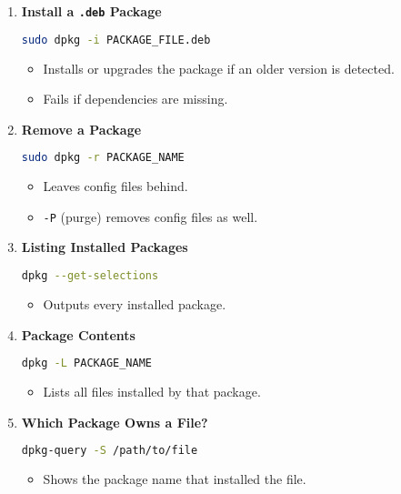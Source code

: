 \documentclass[a4paper]{report}
\begin{document}
\begin{enumerate}
    \item \textbf{Install a \texttt{.deb} Package}
    \begin{lstlisting}[language=bash]
sudo dpkg -i PACKAGE_FILE.deb
    \end{lstlisting}
    \begin{itemize}
        \item Installs or upgrades the package if an older version is detected.
        \item Fails if dependencies are missing.
    \end{itemize}

    \item \textbf{Remove a Package}
    \begin{lstlisting}[language=bash]
sudo dpkg -r PACKAGE_NAME
    \end{lstlisting}
    \begin{itemize}
        \item Leaves config files behind.
        \item \texttt{-P} (purge) removes config files as well.
    \end{itemize}

    \item \textbf{Listing Installed Packages}
    \begin{lstlisting}[language=bash]
dpkg --get-selections
    \end{lstlisting}
    \begin{itemize}
        \item Outputs every installed package.
    \end{itemize}

    \item \textbf{Package Contents}
    \begin{lstlisting}[language=bash]
dpkg -L PACKAGE_NAME
    \end{lstlisting}
    \begin{itemize}
        \item Lists all files installed by that package.
    \end{itemize}

    \item \textbf{Which Package Owns a File?}
    \begin{lstlisting}[language=bash]
dpkg-query -S /path/to/file
    \end{lstlisting}
    \begin{itemize}
        \item Shows the package name that installed the file.
    \end{itemize}


\end{enumerate}
\end{document}
